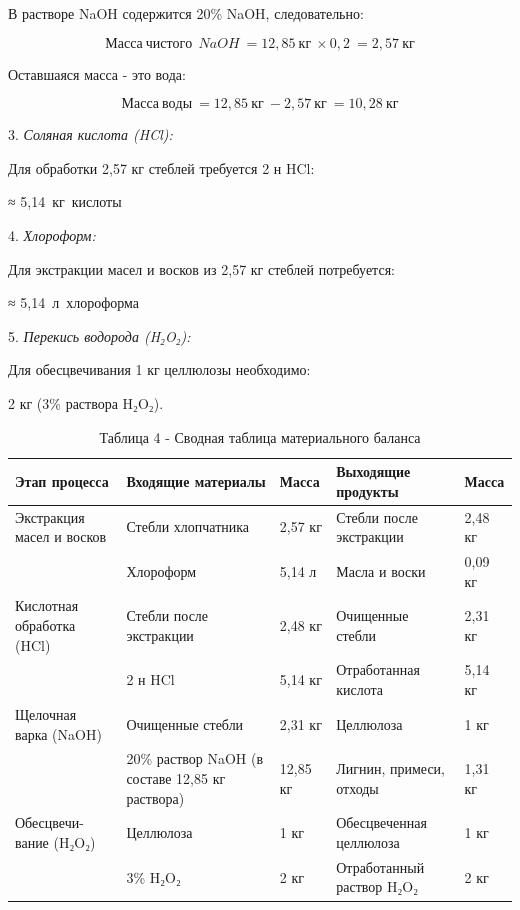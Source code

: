 \begin{multicols}{2}
В растворе NaOH содержится 20\% NaOH, следовательно:

\[Масса\ чистого\ \ NaOH\  = 12,85\ кг\  \times 0,2\  = 2,57\ кг\]

Оставшаяся масса - это вода:

\[Масса\ воды\  = 12,85\ кг\  - 2,57\ кг\  = 10,28\ кг\]

3. \emph{Соляная кислота (HCl):}

Для обработки 2,57 кг стеблей требуется 2 н HCl:

≈ 5,14~кг~кислоты

4. \emph{Хлороформ:}

Для экстракции масел и восков из 2,57 кг стеблей потребуется:

≈ 5,14~л~хлороформа

5. \emph{Перекись водорода (H₂O₂):}

Для обесцвечивания 1 кг целлюлозы необходимо:

2 кг (3\% раствора H₂O₂).
\end{multicols}

\begin{table}[H]
\caption*{Таблица 4 - Сводная таблица материального баланса}
\centering
\begin{tabular}{|p{}|p{}|l|p{}|l|}
\hline
Этап процесса & Входящие материалы & Масса & Выходящие продукты & Масса \\ \hline
Экстракция масел и восков & Стебли хлопчатника & 2,57 кг & Стебли после экстракции & 2,48 кг \\ \hline
 & Хлороформ & 5,14 л & Масла и воски & 0,09 кг \\ \hline
Кислотная обработка (HCl) & Стебли после экстракции & 2,48 кг & Очищенные стебли & 2,31 кг \\ \hline
 & 2 н HCl & 5,14 кг & Отработанная кислота & 5,14 кг \\ \hline
Щелочная варка (NaOH) & Очищенные стебли & 2,31 кг & Целлюлоза & 1 кг \\ \hline
 & 20\% раствор NaOH (в составе 12,85 кг раствора) & 12,85 кг & Лигнин, примеси, отходы & 1,31 кг \\ \hline
Обесцвечи-вание (H₂O₂) & Целлюлоза & 1 кг & Обесцвеченная целлюлоза & 1 кг \\ \hline
 & 3\% H₂O₂ & 2 кг & Отработанный раствор H₂O₂ & 2 кг \\ \hline
\end{tabular}
\end{table}

